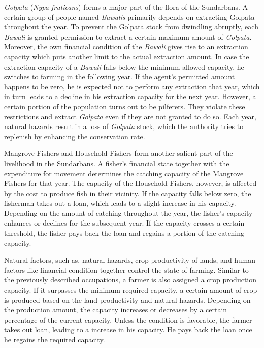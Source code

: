 \documentclass[final,5p,times,twocolumn,authoryear]{elsarticle}
\begin{document}
\textit{Golpata} (\textit{Nypa fruticans}) forms a major part of the flora of the Sundarbans. A certain group of people named \textit{Bawalis} primarily depends on extracting Golpata throughout the year. To prevent the Golpata stock from dwindling abruptly, each \textit{Bawali} is granted permission to extract a certain maximum amount of \textit{Golpata}. Moreover, the own financial condition of the \textit{Bawali} gives rise to an extraction capacity which puts another limit to the actual extraction amount. In case the extraction capacity of a \textit{Bawali} falls below the minimum allowed capacity, he switches to farming in the following year. If the agent’s permitted amount happens to be zero, he is expected not to perform any extraction that year, which in turn leads to a decline in his extraction capacity for the next year. However, a certain portion of the population turns out to be pilferers. They violate these restrictions and extract \textit{Golpata} even if they are not granted to do so. Each year, natural hazards result in a loss of \textit{Golpata} stock, which the authority tries to replenish by enhancing the conservation rate.

Mangrove Fishers and Household Fishers form another salient part of the livelihood in the Sundarbans. A fisher’s financial state together with the expenditure for movement determines the catching capacity of the Mangrove Fishers for that year. The capacity of the Household Fishers, however, is affected by the cost to produce fish in their vicinity. If the capacity falls below zero, the fisherman takes out a loan, which leads to a slight increase in his capacity. Depending on the amount of catching throughout the year, the fisher’s capacity enhances or declines for the subsequent year. If the capacity crosses a certain threshold, the fisher pays back the loan and regains a portion of the catching capacity.

Natural factors, such as, natural hazards, crop productivity of lands, and human factors like financial condition together control the state of farming. Similar to the previously described occupations, a farmer is also assigned a crop production capacity. If it surpasses the minimum required capacity, a certain amount of crop is produced based on the land productivity and natural hazards. Depending on the production amount, the capacity increases or decreases by a certain percentage of the current capacity. Unless the condition is favorable, the farmer takes out loan, leading to a increase in his capacity. He pays back the loan once he regains the required capacity.
\end{document}
